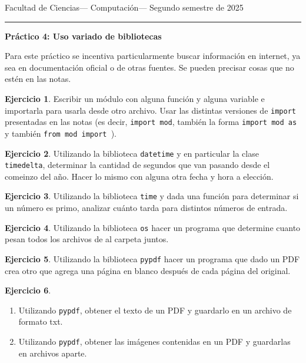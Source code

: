 \documentclass[a4paper,12pt]{book}
\theoremstyle{definition}
\newtheorem{ejercicio}{Ejercicio}
\begin{document}
	
	\noindent
	\centerline{\sc
		Facultad de Ciencias\hfill---\hfill
		Computación\hfill---\hfill
		Segundo semestre de 2025}\smallbreak\hrule
	
	\bigbreak
	\centerline{\Large\textbf{Práctico 4: Uso variado de bibliotecas}}
	\bigbreak
	
	Para este práctico se incentiva particularmente buscar información en internet, ya sea en documentación oficial o de otras fuentes. Se pueden precisar cosas que no estén en las notas.
	
	\begin{ejercicio}
		Escribir un módulo con alguna función y alguna variable e importarla para usarla desde otro archivo. Usar las distintas versiones de {\tt import} presentadas en las notas (es decir, {\tt import mod}, también la forma {\tt import mod as} y también {\tt from mod import }).
	\end{ejercicio}
	
	\begin{ejercicio}
		Utilizando la biblioteca {\tt datetime} y en particular la clase {\tt timedelta}, determinar la cantidad de segundos que van pasando desde el comeinzo del año. Hacer lo mismo con alguna otra fecha y hora a elección.
	\end{ejercicio}
	
	\begin{ejercicio}
		Utilizando la biblioteca {\tt time} y dada una función para determinar si un número es primo, analizar cuánto tarda para distintos números de entrada.
	\end{ejercicio}
	
	\begin{ejercicio}
		Utilizando la biblioteca {\tt os} hacer un programa que determine cuanto pesan todos los archivos de al carpeta juntos.
	\end{ejercicio}
	
	\begin{ejercicio}
		Utilizando la biblioteca {\tt pypdf} hacer un programa que dado un PDF crea otro que agrega una página en blanco después de cada página del original.
	\end{ejercicio}
	
	\begin{ejercicio}
		\begin{enumerate}
			\item Utilizando {\tt pypdf}, obtener el texto de un PDF y guardarlo en un archivo de formato txt.
			
			\item Utilizando {\tt pypdf}, obtener las imágenes contenidas en un PDF y guardarlas en archivos aparte.
		\end{enumerate}
	\end{ejercicio}
	
\end{document}
